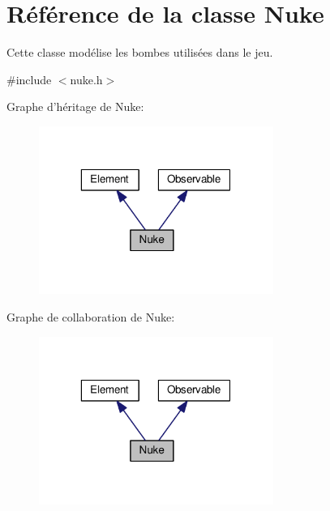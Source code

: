 \hypertarget{classNuke}{\section{Référence de la classe Nuke}
\label{classNuke}
}


Cette classe modélise les bombes utilisées dans le jeu.  




{\ttfamily \#include $<$nuke.\+h$>$}



Graphe d'héritage de Nuke\+:\nopagebreak
\begin{figure}[H]
\begin{center}
\leavevmode
\includegraphics[width=217pt]{d7/d17/classNuke__inherit__graph}
\end{center}
\end{figure}


Graphe de collaboration de Nuke\+:\nopagebreak
\begin{figure}[H]
\begin{center}
\leavevmode
\includegraphics[width=217pt]{dc/d8c/classNuke__coll__graph}
\end{center}
\end{figure}
